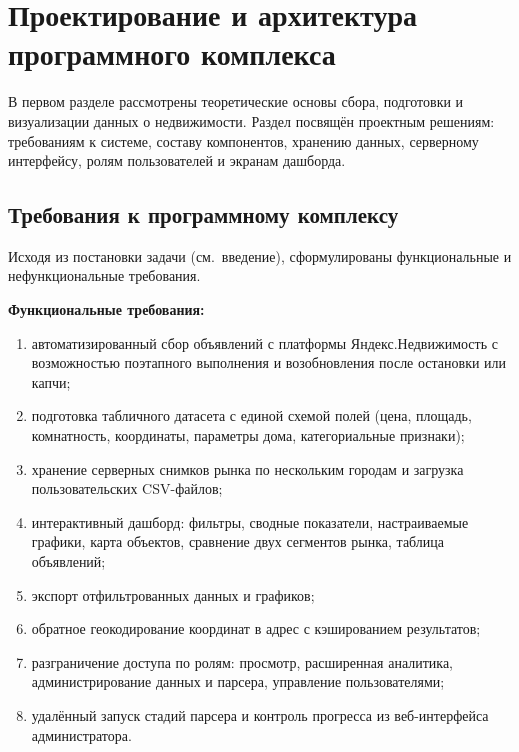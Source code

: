 \section{Проектирование и архитектура программного комплекса}

В первом разделе рассмотрены теоретические основы сбора, подготовки и визуализации данных о недвижимости. Раздел посвящён проектным решениям: требованиям к системе, составу компонентов, хранению данных, серверному интерфейсу, ролям пользователей и экранам дашборда.

\subsection{Требования к программному комплексу}

Исходя из постановки задачи (см.~введение), сформулированы функциональные и нефункциональные требования.

\textbf{Функциональные требования:}
\begin{enumerate}
    \item автоматизированный сбор объявлений с платформы Яндекс.Недвижимость с возможностью поэтапного выполнения и возобновления после остановки или капчи;
    \item подготовка табличного датасета с единой схемой полей (цена, площадь, комнатность, координаты, параметры дома, категориальные признаки);
    \item хранение серверных снимков рынка по нескольким городам и загрузка пользовательских CSV-файлов;
    \item интерактивный дашборд: фильтры, сводные показатели, настраиваемые графики, карта объектов, сравнение двух сегментов рынка, таблица объявлений;
    \item экспорт отфильтрованных данных и графиков;
    \item обратное геокодирование координат в адрес с кэшированием результатов;
    \item разграничение доступа по ролям: просмотр, расширенная аналитика, администрирование данных и парсера, управление пользователями;
    \item удалённый запуск стадий парсера и контроль прогресса из веб-интерфейса администратора.
\end{enumerate}

